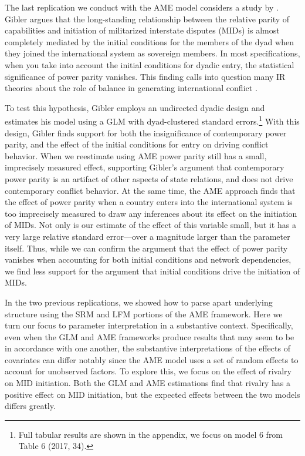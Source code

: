 The last replication we conduct with the AME model considers a study by \citet{gibler:2017}. Gibler argues that the long-standing relationship between the relative parity of capabilities and initiation of militarized interstate disputes (MIDs) is almost completely mediated by the initial conditions for the members of the dyad when they joined the international system as sovereign members. In most specifications, when you take into account the initial conditions for dyadic entry, the statistical significance of power parity vanishes. This finding calls into question many IR theories about the role of balance in generating international conflict \citep{organski:1958}.

To test this hypothesis, Gibler employs an undirected dyadic design and estimates his model using a GLM with dyad-clustered standard errors.\footnote{Full tabular results are shown in the appendix, we focus on model 6 from Table 6 (2017, 34).} With this design, Gibler finds support for both the insignificance of contemporary power parity, and the effect of the initial conditions for entry on driving conflict behavior. When we reestimate using AME power parity still has a small, imprecisely measured effect, supporting Gibler's argument that contemporary power parity is an artifact of other aspects of state relations, and does not drive contemporary conflict behavior. At the same time, the AME approach finds that the effect of power parity when a country enters into the international system is too imprecisely measured to draw any inferences about its effect on the initiation of MIDs. Not only is our estimate of the effect of this variable small, but it has a very large relative standard error---over a magnitude larger than the parameter itself. Thus, while we can confirm the argument that the effect of power parity vanishes when accounting for both initial conditions and network dependencies, we find less support for the argument that initial conditions drive the initiation of MIDs.

In the two previous replications, we showed how to parse apart underlying structure using the SRM and LFM portions of the AME framework. Here we turn our focus to parameter interpretation in a substantive context. Specifically, even when the GLM and AME frameworks produce results that may seem to be in accordance with one another, the substantive interpretations of the effects of covariates can differ notably since the AME model uses a set of random effects to account for unobserved factors. To explore this, we focus on the effect of rivalry on MID initiation. Both the GLM and AME estimations find that rivalry has a positive effect on MID initiation, but the expected effects between the two models differs greatly.

